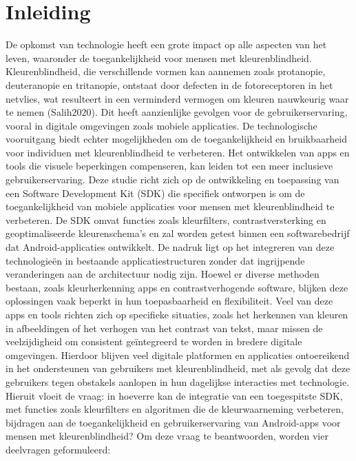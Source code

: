 \section{Inleiding}%
\label{sec:inleiding}
De opkomst van technologie heeft een grote impact op alle aspecten van het leven, waaronder de 
toegankelijkheid voor mensen met kleurenblindheid. Kleurenblindheid, die verschillende vormen kan 
aannemen zoals protanopie, deuteranopie en tritanopie, ontstaat door defecten in de fotoreceptoren 
in het netvlies, wat resulteert in een verminderd vermogen om kleuren nauwkeurig waar te nemen 
(Salih2020). Dit heeft aanzienlijke gevolgen voor de gebruikerservaring, vooral in digitale 
omgevingen zoals mobiele applicaties. De technologische vooruitgang biedt echter mogelijkheden om de 
toegankelijkheid en bruikbaarheid voor individuen met kleurenblindheid te verbeteren. Het ontwikkelen 
van apps en tools die visuele beperkingen compenseren, kan leiden tot een meer inclusieve 
gebruikerservaring. Deze studie richt zich op de ontwikkeling en toepassing van een Software 
Development Kit (SDK) die specifiek ontworpen is om de toegankelijkheid van mobiele applicaties 
voor mensen met kleurenblindheid te verbeteren. De SDK omvat functies zoals kleurfilters, 
contrastversterking en geoptimaliseerde kleurenschema’s en zal worden getest binnen een 
softwarebedrijf dat Android-applicaties ontwikkelt. De nadruk ligt op het integreren van deze 
technologieën in bestaande applicatiestructuren zonder dat ingrijpende veranderingen aan de 
architectuur nodig zijn. Hoewel er diverse methoden bestaan, zoals kleurherkenning apps en 
contrastverhogende software, blijken deze oplossingen vaak beperkt in hun toepasbaarheid en 
flexibiliteit. Veel van deze apps en tools richten zich op specifieke situaties, zoals het herkennen 
van kleuren in afbeeldingen of het verhogen van het contrast van tekst, maar missen de veelzijdigheid 
om consistent geïntegreerd te worden in bredere digitale omgevingen. Hierdoor blijven veel digitale 
platformen en applicaties ontoereikend in het ondersteunen van gebruikers met kleurenblindheid, met 
als gevolg dat deze gebruikers tegen obstakels aanlopen in hun dagelijkse interacties met 
technologie. Hieruit vloeit de vraag: in hoeverre kan de integratie van een toegespitste SDK, met 
functies zoals kleurfilters en algoritmen die de kleurwaarneming verbeteren, bijdragen aan de 
toegankelijkheid en gebruikerservaring van Android-apps voor mensen met kleurenblindheid?
Om deze vraag te beantwoorden, worden vier deelvragen geformuleerd:

